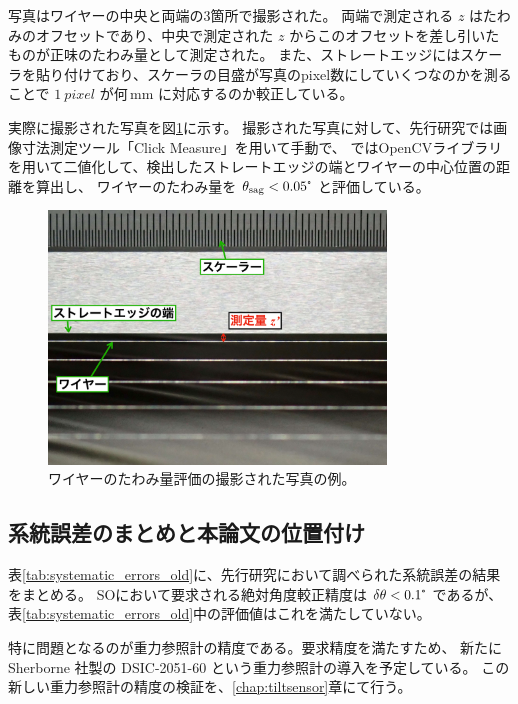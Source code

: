 \documentclass[../../main.tex]{subfiles}
\begin{document}
写真はワイヤーの中央と両端の3箇所で撮影された。
両端で測定される $z$ はたわみのオフセットであり、中央で測定された $z$ からこのオフセットを差し引いたものが正味のたわみ量として測定された。
また、ストレートエッジにはスケーラを貼り付けており、スケーラの目盛が写真のpixel数にしていくつなのかを測ることで
$\SI{1}{pixel}$ が何\,$\mathrm{mm}$ に対応するのか較正している。

実際に撮影された写真を図\ref{fig:wiresag_picture_old}に示す。
撮影された写真に対して、先行研究\cite{swg:murata}では画像寸法測定ツール「Click Measure」を用いて手動で、
\cite{swg:iijima}ではOpenCVライブラリを用いて二値化して、検出したストレートエッジの端とワイヤーの中心位置の距離を算出し、
ワイヤーのたわみ量を $\theta_{\mathrm{sag}} < 0.05\tcdegree$ と評価している。

\begin{figure}[H]
    \centering
    \includegraphics[width=0.8\textwidth]{wiregrid/wiresag_picture_old.pdf}
    \caption{ワイヤーのたわみ量評価の撮影された写真の例。}
    \label{fig:wiresag_picture_old}
\end{figure}
\subsection{系統誤差のまとめと本論文の位置付け}
表\ref{tab:systematic_errors_old}に、先行研究において調べられた系統誤差の結果をまとめる。
SOにおいて要求される絶対角度較正精度は $\delta\theta < 0.1\tcdegree$ であるが、
表\ref{tab:systematic_errors_old}中の評価値はこれを満たしていない。

特に問題となるのが重力参照計の精度である。要求精度を満たすため、
新たに Sherborne 社製の DSIC-2051-60 という重力参照計の導入を予定している。
この新しい重力参照計の精度の検証を、\ref{chap:tiltsensor}章にて行う。
\end{document}
